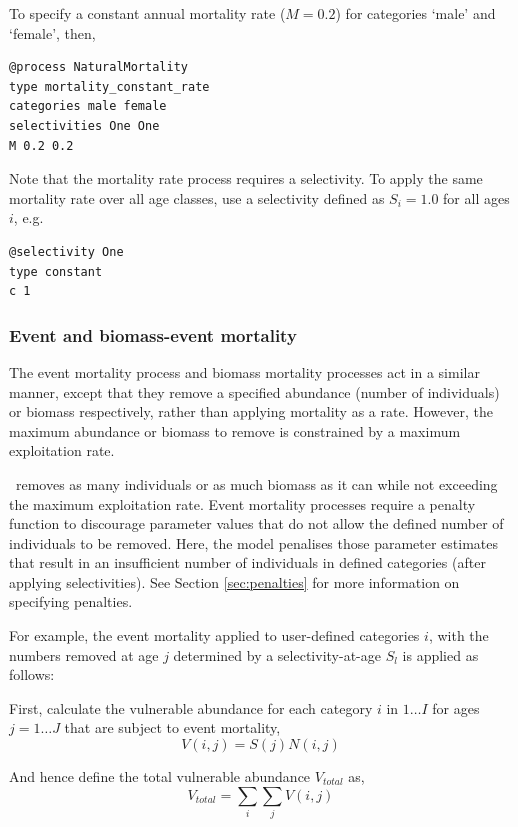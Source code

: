 To specify a constant annual mortality rate ($M=0.2$) for categories `male' and `female', then, 
{\small{\begin{verbatim}
@process NaturalMortality
type mortality_constant_rate
categories male female
selectivities One One
M 0.2 0.2
\end{verbatim}}}
Note that the mortality rate process requires a selectivity. To apply the same mortality rate over all age classes, use a selectivity defined as $S_i=1.0$ for all ages $i$, e.g.
{\small{\begin{verbatim}
@selectivity One
type constant
c 1
\end{verbatim}}}

\subsubsection*{Event and biomass-event mortality}

The event mortality process and biomass mortality processes act in a similar manner, except that they remove a specified abundance (number of individuals) or biomass respectively, rather than applying mortality as a rate. However, the maximum abundance or biomass to remove is constrained by a maximum exploitation rate.

 \CNAME\ removes as many individuals or as much biomass as it can while not exceeding the maximum exploitation rate. Event mortality processes require a penalty function to discourage parameter values that do not allow the defined number of individuals to be removed. Here, the model penalises those parameter estimates that result in an insufficient number of individuals in defined categories (after applying selectivities). See Section \ref{sec:penalties} for more information on specifying penalties.

For example, the event mortality applied to user-defined categories $i$, with the numbers removed at age $j$ determined by a selectivity-at-age $S_l$ is applied as follows:

First, calculate the vulnerable abundance for each category $i$ in $1 \ldots I$ for ages $j = 1 \ldots J$ that are subject to event mortality,
\begin{equation}
  V(i,j) = S(j) N(i,j)
\end{equation}

And hence define the total vulnerable abundance $V_{total}$ as,
\begin{equation}
  V_{total}  = \sum\limits_i {\sum\limits_j {V(i,j)}} 
\end{equation}

